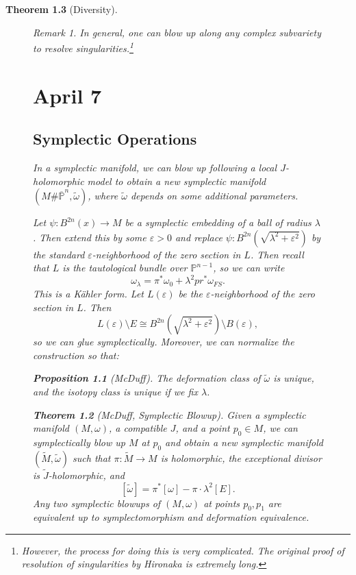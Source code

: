 \documentclass[leqno, openany]{memoir}
\newtheorem{thm}{Theorem}[chapter]
\newtheorem{prop}[thm]{Proposition}
\theoremstyle{definition}
\theoremstyle{remark}
\newtheorem{rmk}[thm]{Remark}
\theoremstyle{plain}
\theoremstyle{definition}
\theoremstyle{remark}
\renewcommand{\P}{\mathbb{P}}
\newcommand{\ep}{\varepsilon}
\newcommand{\wt}[1]{\widetilde{#1}}
\begin{document}
\begin{thm}[Diversity]
\begin{figure}[H]
    \begin{rmk} In general, one can blow up along any complex subvariety to
        resolve singularities.\footnote{However, the process for doing this is
        very complicated. The original proof of resolution of singularities by
    Hironaka is extremely long.} \end{rmk}
    
    \chapter{April 7}%
    
    \section{Symplectic Operations}%
    
    In a symplectic manifold, we can blow up following a local $J$-holomorphic
    model to obtain a new symplectic manifold $(M \# \overline{\P}^n,
    \widetilde{\omega})$, where $\widetilde{\omega}$ depends on some additional
    parameters.

    Let $\psi: B^{2n}(x) \to M$ be a symplectic embedding of a ball of radius
    $\lambda$. Then extend this by some $\ep >0$ and replace $\psi:
    B^{2n}(\sqrt{\lambda^2 + \ep^2})$ by the standard $\ep$-neighborhood of the
    zero section in $L$. Then recall that $L$ is the tautological bundle over
    $\P^{n-1}$, so we can write \[ \omega_{\lambda} = \pi^* \omega_0 +
    \lambda^2 pr^* \omega_{FS}. \] This is a K\"ahler form. Let $L(\ep)$ be the
    $\ep$-neighborhood of the zero section in $L$. Then \[ L(\ep) \setminus E
    \cong B^{2n}(\sqrt{\lambda^2 + \ep^2}) \setminus B(\ep), \] so we can glue
    symplectically. Moreover, we can normalize the construction so that:
    \begin{prop}[McDuff] The deformation class of $\wt{\omega}$ is unique, and
    the isotopy class is unique if we fix $\lambda$.  \end{prop}
    
    \begin{thm}[McDuff, Symplectic Blowup] Given a symplectic manifold $(M,
        \omega)$, a compatible $J$, and a point $p_0 \in M$, we can
        symplectically blow up $M$ at $p_0$ and obtain a new symplectic
        manifold $(\wt{M}, \wt{\omega})$ such that $\pi: \wt{M} \to M$ is
        holomorphic, the exceptional divisor is $\wt{J}$-holomorphic, and \[
        [\wt{\omega}] = \pi^* [\omega] - \pi \cdot \lambda^2 [E]. \] Any two
        symplectic blowups of $(M, \omega)$ at points $p_0, p_1$ are equivalent
        up to symplectomorphism and deformation equivalence.  \end{thm}


\end{figure}
\end{thm}
\end{document}
